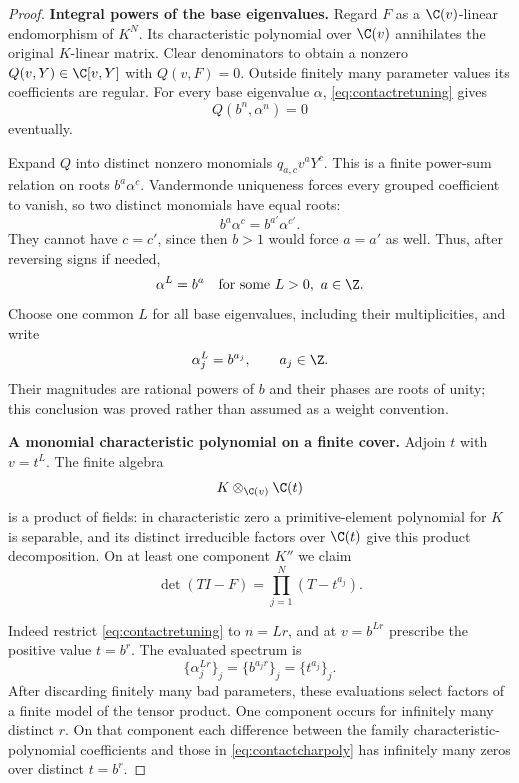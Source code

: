 \documentclass[11pt,a4paper]{article}
\theoremstyle{named}\newtheorem{finding}{Finding}[section]
\theoremstyle{definition}\newtheorem{definition}[finding]{Definition}
\theoremstyle{remark}\newtheorem{remark}[finding]{Remark}
\begin{document}
\begin{proof}
\par\smallskip\noindent\textbf{Integral powers of the base eigenvalues.}\quad
Regard $F$ as a $\C(v)$-linear endomorphism of $K^N$.
Its characteristic polynomial over $\C(v)$ annihilates
the original $K$-linear matrix. Clear denominators to
obtain a nonzero $Q(v,Y)\in\C[v,Y]$ with $Q(v,F)=0$.
Outside finitely many parameter values its coefficients
are regular. For every base eigenvalue $\alpha$,
\eqref{eq:contactretuning} gives
\[
 Q(b^n,\alpha^n)=0
\]
eventually.

Expand $Q$ into distinct nonzero monomials
$q_{a,c}v^aY^c$. This is a finite power-sum relation
on roots $b^a\alpha^c$.
Vandermonde uniqueness forces every grouped coefficient
to vanish, so two distinct monomials have equal roots:
\[
 b^a\alpha^c=b^{a'}\alpha^{c'}.
\]
They cannot have $c=c'$, since then $b>1$ would force
$a=a'$ as well. Thus, after reversing signs if needed,
\[
 \alpha^L=b^a\quad\hbox{for some }L>0,\ a\in\Z.
\]
Choose one common $L$ for all base eigenvalues, including
their multiplicities, and write
\begin{equation}\label{eq:contactbasecharacters}
 \alpha_j^L=b^{a_j},\qquad a_j\in\Z.
\end{equation}
Their magnitudes are rational powers of $b$ and their
phases are roots of unity; this conclusion was proved
rather than assumed as a weight convention.

\par\smallskip\noindent\textbf{A monomial characteristic polynomial on a finite cover.}\quad
Adjoin $t$ with $v=t^L$.
The finite algebra
\[
 K\otimes_{\C(v)}\C(t)
\]
is a product of fields: in characteristic zero a
primitive-element polynomial for $K$ is separable,
and its distinct irreducible factors over $\C(t)$
give this product decomposition.
On at least one component $K''$ we claim
\begin{equation}\label{eq:contactcharpoly}
 \det(TI-F)=\prod_{j=1}^N(T-t^{a_j}).
\end{equation}

Indeed restrict \eqref{eq:contactretuning} to $n=Lr$,
and at $v=b^{Lr}$ prescribe the positive value $t=b^r$.
The evaluated spectrum is
\[
 \{\alpha_j^{Lr}\}_j=\{b^{a_jr}\}_j
                  =\{t^{a_j}\}_j.
\]
After discarding finitely many bad parameters, these
evaluations select factors of a finite model of the
tensor product. One component occurs for infinitely
many distinct $r$.
On that component each difference between the family
characteristic-polynomial coefficients and those
in \eqref{eq:contactcharpoly} has infinitely many zeros
over distinct $t=b^r$.


\end{proof}
\end{document}
